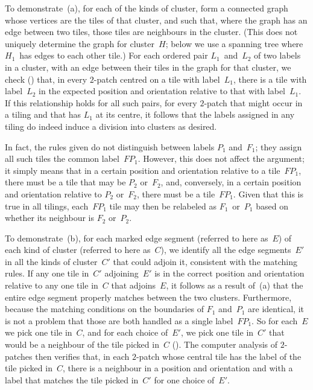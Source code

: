 To demonstrate~(a), for each of the kinds of cluster, form a connected
graph whose vertices are the tiles of that cluster, and such that,
where the graph has an edge between two tiles, those tiles are
neighbours in the cluster.  (This does not uniquely determine the
graph for cluster~$H$; below we use a spanning tree where $H_1$~has
edges to each other tile.)  For each ordered pair $L_1$~and~$L_2$ of
two labels in a cluster, with an edge between their tiles in the graph
for that cluster, we check () that, in
every $2$-patch centred on a tile
with label~$L_1$, there is a tile with label~$L_2$ in the expected
position and orientation relative to that with label~$L_1$.  If this
relationship
holds for all such pairs, for every $2$-patch that might occur in a
tiling and that has $L_1$ at its centre, it follows that
the labels assigned in any tiling do indeed induce a division into
clusters as desired.

In fact, the rules given do not distinguish between labels $P_1$
and~$F_1$; they assign all such tiles the common label~$FP_1$.
However, this does not affect the argument; it simply means that in a
certain position and orientation relative to a tile~$FP_1$, there must
be a tile that may be $P_2$ or~$F_2$, and, conversely, in a certain
position and orientation relative to $P_2$ or~$F_2$, there must be a
tile~$FP_1$.  Given that this is true in all tilings, each~$FP_1$ tile
may then be relabeled as $F_1$~or~$P_1$ based on whether its
neighbour is $F_2$ or~$P_2$.

To demonstrate~(b), for each marked edge segment (referred to here
as~$E$) of each kind of cluster (referred to here as~$C$), we identify
all the edge segments~$E'$ in all the kinds of cluster~$C'$ that could
adjoin it, consistent with the matching rules.  If any one tile
in~$C'$ adjoining~$E'$ is in the correct position and orientation
relative to any one tile in~$C$ that adjoins~$E$, it follows as a
result of~(a) that the entire edge segment properly matches between
the two clusters.  Furthermore, because the matching conditions on the
boundaries of $F_1$ and~$P_1$ are identical, it is not a problem that
those are both handled as a single label~$FP_1$.  So for each~$E$ we
pick one tile in~$C$, and for each choice of~$E'$, we pick one tile
in~$C'$ that would be a neighbour of the tile picked in~$C$
().  The
computer analysis of $2$-patches then verifies that, in each $2$-patch
whose central tile has the label of the tile picked in~$C$, there is a
neighbour in a position and orientation and with a label that matches
the tile picked in~$C'$ for one choice of~$E'$.

